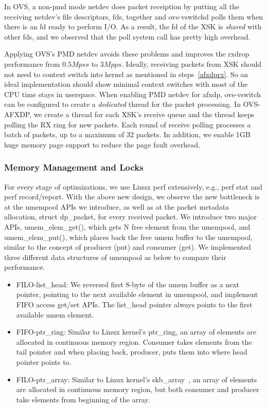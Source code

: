 \documentclass[10pt]{sigplanconf}
\begin{document}
In OVS, a non-pmd mode netdev does packet receiption by putting all the receiving
netdev's file descriptors, fds, together and ovs-vswitchd polls them when there is an fd
ready to perform I/O.  As a result, the fd of the XSK is {\em shared} with other fds, and
we observed that the poll system call has pretty high overhead.

Applying OVS's PMD netdev avoids these problems and improves the rxdrop performance
from $0.5Mpss$ to $3Mpps$.  Ideally, receiving packets from XSK should not need to context
switch into kernel as mentioned in steps~\ref{afxdprx}. So an ideal implementation
should show minimal context switches with most of the CPU time stays in userspace. 
When enabling PMD netdev for afxdp, ovs-vswitch can be
configured to create a {\em dedicated} thread for the packet processing.
In OVS-AFXDP, we create a thread for each XSK's receive queue and the thread keeps polling
the RX ring for new packets.  Each round of receive polling processes a batch of
packets, up to a maximum of 32 packets. In addition, we enable 1GB huge memory page support
to reduce the page fault overhead.

\subsubsection{Memory Management and Locks}\label{memorym}
For every stage of optimizations, we use Linux perf extensively, e.g., perf stat
and perf record/report.  With the above new design, we observe the new bottleneck
is at the umempool APIs we introduce, as well as at the
packet metadata allocation, struct dp\_packet, for every received packet.
We introduce two major APIs, umem\_elem\_get(), which gets N free element from the
umempool, and umem\_elem\_put(), which places back the free umem buffer to
the umempool, similar to the concept of producer (put) and consumer (get).
We implemented three different data structures of umempool as below
to compare their performance.
\begin{itemize}
\item FILO-list\_head: We reversed first 8-byte of the umem buffer as a next pointer,
pointing to the next available element in umempool, and implement FIFO access get/set
APIs. The list\_head pointer always points to the first available umem element.
\item FIFO-ptr\_ring: Similar to Linux kernel's ptr\_ring, an array of elements are
allocated in continuous memory region.
Consumer takes elements from the tail pointer and when placing back, producer, puts
them into where head pointer points to.
\item FILO-ptr\_array: Similar to Linux kernel's skb\_array~\cite{skbarray},
an array of elements are allocated
in continuous memory region, but both consumer and producer take elements
from beginning of the array.
\end{itemize}
\end{document}
